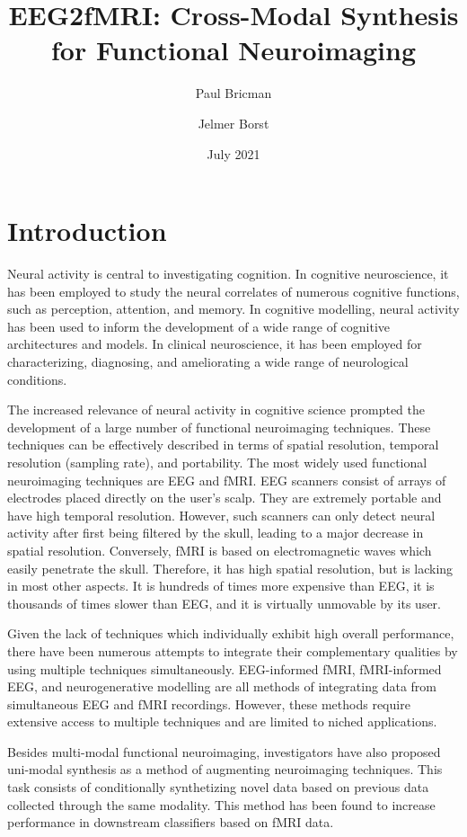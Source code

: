 \documentclass{article}
\title{EEG2fMRI: Cross-Modal Synthesis for Functional Neuroimaging}
\author{Paul Bricman}
\author{Jelmer Borst}
\affil{University of Groningen}
\date{July 2021}
\begin{document}
\maketitle

\section{Introduction}

Neural activity is central to investigating cognition. In cognitive neuroscience, it has been employed to study the neural correlates of numerous cognitive functions, such as perception, attention, and memory. In cognitive modelling, neural activity has been used to inform the development of a wide range of cognitive architectures and models. In clinical neuroscience, it has been employed for characterizing, diagnosing, and ameliorating a wide range of neurological conditions. 

The increased relevance of neural activity in cognitive science prompted the development of a large number of functional neuroimaging techniques. These techniques can be effectively described in terms of spatial resolution, temporal resolution (sampling rate), and portability. The most widely used functional neuroimaging techniques are EEG and fMRI. EEG scanners consist of arrays of electrodes placed directly on the user's scalp. They are extremely portable and have high temporal resolution. However, such scanners can only detect neural activity after first being filtered by the skull, leading to a major decrease in spatial resolution. Conversely, fMRI is based on electromagnetic waves which easily penetrate the skull. Therefore, it has high spatial resolution, but is lacking in most other aspects. It is hundreds of times more expensive than EEG, it is thousands of times slower than EEG, and it is virtually unmovable by its user.

Given the lack of techniques which individually exhibit high overall performance, there have been numerous attempts to integrate their complementary qualities by using multiple techniques simultaneously. EEG-informed fMRI, fMRI-informed EEG, and neurogenerative modelling are all methods of integrating data from simultaneous EEG and fMRI recordings. However, these methods require extensive access to multiple techniques and are limited to niched applications.

Besides multi-modal functional neuroimaging, investigators have also proposed uni-modal synthesis as a method of augmenting neuroimaging techniques. This task consists of conditionally synthetizing novel data based on previous data collected through the same modality. This method has been found to increase performance in downstream classifiers based on fMRI data.
\end{document}
